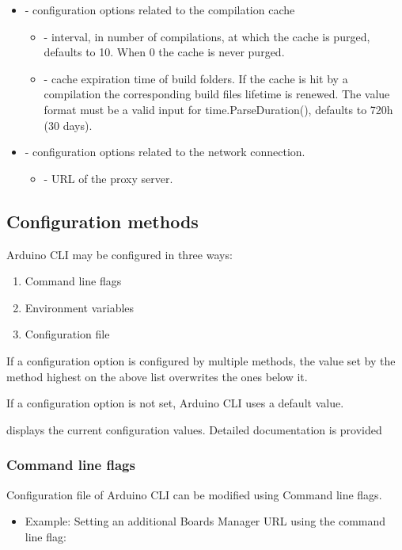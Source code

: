 \begin{itemize}
\begin{itemize}
	\end{itemize}
	\item {} - configuration options related to the compilation cache
	\begin{itemize}
		\item {} - interval, in number of compilations, at which the cache is purged, defaults to 10. When 0 the cache is never purged.
		\item {} - cache expiration time of build folders. If the cache is hit by a compilation the corresponding build files lifetime is renewed. The value format must be a valid input for time.ParseDuration(), defaults to 720h (30 days).
	\end{itemize}
		\item {} - configuration options related to the network connection.
	\begin{itemize}
		\item {} - URL of the proxy server.
	\end{itemize}
\end{itemize}

\subsection{Configuration methods}
Arduino CLI may be configured in three ways:
\begin{enumerate}
	\item Command line flags
	\item Environment variables
	\item Configuration file
\end{enumerate}

If a configuration option is configured by multiple methods, the value set by the method highest on the above list overwrites the ones below it.

If a configuration option is not set, Arduino CLI uses a default value.

 displays the current configuration values. Detailed documentation is provided \cite{ArduinoCLIConfig:2024}

\subsubsection{Command line flags}
Configuration file of Arduino CLI can be modified using Command line flags. \cite{ArduinoCLIConfig:2024}
\begin{itemize}
	\item Example:
	Setting an additional Boards Manager URL using the  command line flag:
	\newline
	\newline
\end{itemize}

